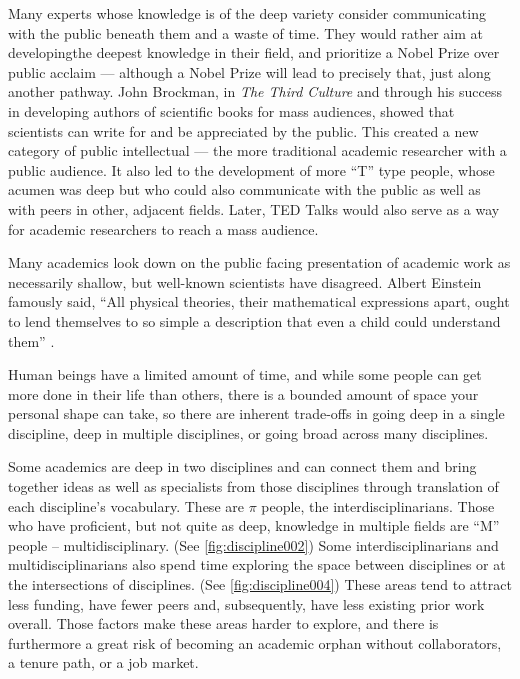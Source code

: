 Many experts whose knowledge is of the deep variety consider communicating with the public beneath them and a waste of time. They would rather aim at developingthe deepest knowledge in their field, and prioritize a Nobel Prize over public acclaim --- although a Nobel Prize will lead to precisely that, just along another pathway. John Brockman, in \emph{The Third Culture} \cite{brockman1996third} and through his success in developing authors of scientific books for mass audiences, showed that scientists can write for and be appreciated by the public. This created a new category of public intellectual --- the more traditional academic researcher with a public audience. It also led to the development of more ``T'' type people, whose acumen was deep but who could also communicate with the public as well as with peers in other, adjacent fields. Later, TED Talks would also serve as a way for academic researchers to reach a mass audience.

Many academics look down on the public facing presentation of academic work as necessarily shallow, but well-known scientists have disagreed. Albert Einstein famously said, ``All physical theories, their mathematical expressions apart, ought to lend themselves to so simple a description that even a child could understand them'' \cite{clark2011einstein}.

Human beings have a limited amount of time, and while some people can get more done in their life than others, there is a bounded amount of space your personal shape can take, so there are inherent trade-offs in going deep in a single discipline, deep in multiple disciplines, or going broad across many disciplines.

Some academics are deep in two disciplines and can connect them and bring together ideas as well as specialists from those disciplines through translation of each discipline's vocabulary. These are \(\pi\) people, the interdisciplinarians. Those who have proficient, but not quite as deep, knowledge in multiple fields are ``M'' people -- multidisciplinary. (See \autoref{fig:discipline002}) Some interdisciplinarians and multidisciplinarians also spend time exploring the space between disciplines or at the intersections of disciplines. (See \autoref{fig:discipline004}) These areas tend to attract less funding, have fewer peers and, subsequently, have less existing prior work overall. Those factors make these areas harder to explore, and there is furthermore a great risk of becoming an academic orphan without collaborators, a tenure path, or a job market. 


